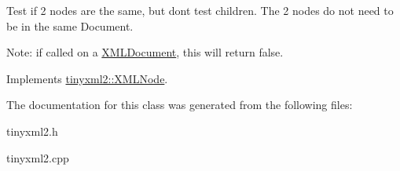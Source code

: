 Test if 2 nodes are the same, but don\textquotesingle{}t test children. The 2 nodes do not need to be in the same Document.

Note\+: if called on a \mbox{\hyperlink{classtinyxml2_1_1_x_m_l_document}{X\+M\+L\+Document}}, this will return false. 

Implements \mbox{\hyperlink{classtinyxml2_1_1_x_m_l_node_a7ce18b751c3ea09eac292dca264f9226}{tinyxml2\+::\+X\+M\+L\+Node}}.



The documentation for this class was generated from the following files\+:\begin{DoxyCompactItemize}
\item 
tinyxml2.\+h\item 
tinyxml2.\+cpp\end{DoxyCompactItemize}
